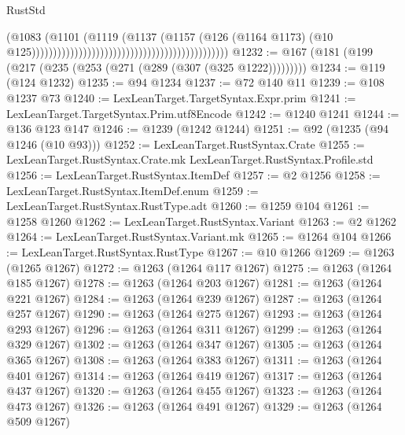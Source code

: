 \begin{lexlean}{RustStd}
\begin{coremodule}
                                                                                  (@1083
                                                                                    (@1101
                                                                                      (@1119
                                                                                        (@1137
                                                                                          (@1157
                                                                                            (@126
                                                                                              (@1164
                                                                                                @1173)
                                                                                              (@10
                                                                                                @125))))))))))))))))))))))))))))))))))))))))))))))
@1232 := @167 (@181 (@199 (@217 (@235 (@253 (@271 (@289 (@307 (@325 @1222)))))))))
@1234 := @119 (@124 @1232)
@1235 := @94 @1234
@1237 := @72 @140 @11
@1239 := @108 @1237 @73
@1240 := LexLeanTarget.TargetSyntax.Expr.prim
@1241 := LexLeanTarget.TargetSyntax.Prim.utf8Encode
@1242 := @1240 @1241
@1244 := @136 @123 @147
@1246 := @1239 (@1242 @1244)
@1251 := @92 (@1235 (@94 @1246 (@10 @93)))
@1252 := LexLeanTarget.RustSyntax.Crate
@1255 := LexLeanTarget.RustSyntax.Crate.mk LexLeanTarget.RustSyntax.Profile.std
@1256 := LexLeanTarget.RustSyntax.ItemDef
@1257 := @2 @1256
@1258 := LexLeanTarget.RustSyntax.ItemDef.enum
@1259 := LexLeanTarget.RustSyntax.RustType.adt
@1260 := @1259 @104
@1261 := @1258 @1260
@1262 := LexLeanTarget.RustSyntax.Variant
@1263 := @2 @1262
@1264 := LexLeanTarget.RustSyntax.Variant.mk
@1265 := @1264 @104
@1266 := LexLeanTarget.RustSyntax.RustType
@1267 := @10 @1266
@1269 := @1263 (@1265 @1267)
@1272 := @1263 (@1264 @117 @1267)
@1275 := @1263 (@1264 @185 @1267)
@1278 := @1263 (@1264 @203 @1267)
@1281 := @1263 (@1264 @221 @1267)
@1284 := @1263 (@1264 @239 @1267)
@1287 := @1263 (@1264 @257 @1267)
@1290 := @1263 (@1264 @275 @1267)
@1293 := @1263 (@1264 @293 @1267)
@1296 := @1263 (@1264 @311 @1267)
@1299 := @1263 (@1264 @329 @1267)
@1302 := @1263 (@1264 @347 @1267)
@1305 := @1263 (@1264 @365 @1267)
@1308 := @1263 (@1264 @383 @1267)
@1311 := @1263 (@1264 @401 @1267)
@1314 := @1263 (@1264 @419 @1267)
@1317 := @1263 (@1264 @437 @1267)
@1320 := @1263 (@1264 @455 @1267)
@1323 := @1263 (@1264 @473 @1267)
@1326 := @1263 (@1264 @491 @1267)
@1329 := @1263 (@1264 @509 @1267)

\end{coremodule}
\end{lexlean}

